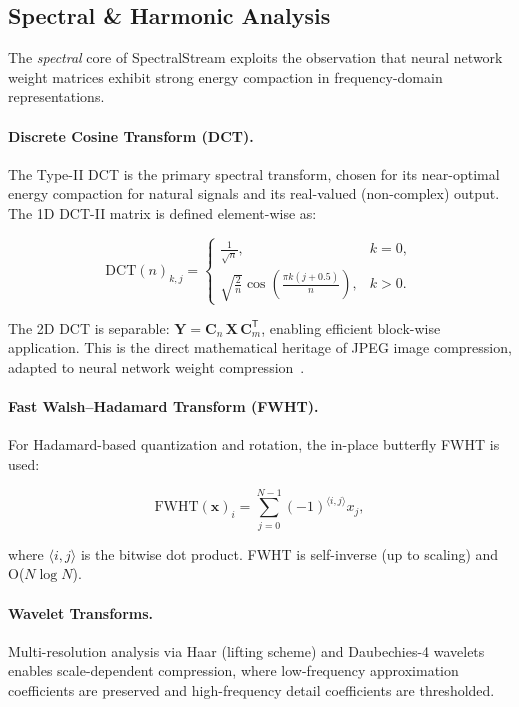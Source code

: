 \documentclass[11pt,a4paper,twocolumn]{article}
\begin{document}
\subsection{Spectral \& Harmonic Analysis}
\label{sec:spectral}

The \emph{spectral} core of SpectralStream exploits the observation that neural network weight matrices exhibit strong energy compaction in frequency-domain representations.

\paragraph{Discrete Cosine Transform (DCT).}
The Type-II DCT is the primary spectral transform, chosen for its near-optimal energy compaction for natural signals and its real-valued (non-complex) output. The 1D DCT-II matrix is defined element-wise as:

\begin{equation}
	\label{eq:dct2}
	\text{DCT}(n)_{k,j} =
	\begin{cases}
		\frac{1}{\sqrt{n}},                                         & k = 0, \\[2pt]
		\sqrt{\frac{2}{n}}\cos\left(\frac{\pi k (j+0.5)}{n}\right), & k > 0.
	\end{cases}
\end{equation}

The 2D DCT is separable: $\mathbf{Y} = \mathbf{C}_n \, \mathbf{X} \, \mathbf{C}_m^\mathsf{T}$, enabling efficient block-wise application. This is the direct mathematical heritage of JPEG image compression, adapted to neural network weight compression~\cite{ahmed1974dct}.

\paragraph{Fast Walsh--Hadamard Transform (FWHT).}
For Hadamard-based quantization and rotation, the in-place butterfly FWHT is used:

\begin{equation}
	\label{eq:fwht}
	\text{FWHT}(\mathbf{x})_i = \sum_{j=0}^{N-1} (-1)^{\langle i, j \rangle} x_j,
\end{equation}

where $\langle i, j \rangle$ is the bitwise dot product. FWHT is self-inverse (up to scaling) and O($N \log N$).

\paragraph{Wavelet Transforms.}
Multi-resolution analysis via Haar (lifting scheme) and Daubechies-4 wavelets enables scale-dependent compression, where low-frequency approximation coefficients are preserved and high-frequency detail coefficients are thresholded.
\end{document}
